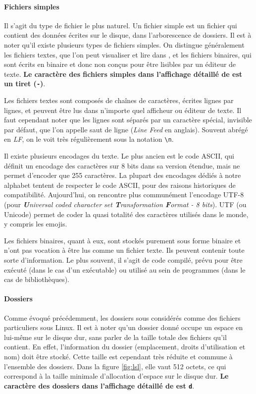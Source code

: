 \paragraph{Fichiers simples}
Il s'agit du type de fichier le plus naturel. Un fichier simple est un fichier qui contient des données écrites sur le disque, dans l'arborescence de dossiers.
Il est à noter qu'il existe plusieurs types de fichiers simples. On distingue généralement les fichiers textes, que l'on peut visualiser et lire dans , et les fichiers binaires, qui sont écrits en binaire et donc non conçus pour être lisibles par un éditeur de texte. \newline
\textbf{Le caractère des fichiers simples dans l'affichage détaillé de  est un tiret (\texttt{-})}.

Les fichiers textes sont composés de chaînes de caractères, écrites lignes par lignes, et peuvent être lus dans n'importe quel afficheur ou éditeur de texte. Il faut cependant noter que les lignes sont séparés par un caractère spécial, invisible par défaut, que l'on appelle saut de ligne (\textit{Line Feed} en anglais). Souvent abrégé en \textit{LF}, on le voit très régulièrement sous la notation \texttt{\textbackslash n}.

Il existe plusieurs encodages du texte. Le plus ancien est le code ASCII, qui définit un encodage des caractères sur 8 bits dans sa version étendue, mais ne permet d'encoder que 255 caractères. La plupart des encodages dédiés à notre alphabet tentent de respecter le code ASCII, pour des raisons historiques de compatibilité. Aujourd'hui, on rencontre plus communément l'encodage UTF-8 (pour \textit{\textbf{U}niversal coded character set \textbf{T}ransformation \textbf{F}ormat - 8 bits}). UTF (ou Unicode) permet de coder la quasi totalité des caractères utilisés dans le monde, y compris les emojis.

Les fichiers binaires, quant à eux, sont stockés purement sous forme binaire et n'ont pas vocation à être lus comme un fichier texte. Ils peuvent contenir toute sorte d'information. Le plus souvent, il s'agit de code compilé, prévu pour être exécuté (dans le cas d'un exécutable) ou utilisé au sein de programmes (dans le cas de bibliothèques).

\paragraph{Dossiers}
Comme évoqué précédemment, les dossiers sous considérés comme des fichiers particuliers sous Linux. Il est à noter qu'un dossier donné occupe un espace en lui-même sur le disque dur, sans parler de la taille totale des fichiers qu'il contient. En effet, l'information du dossier (emplacement, droits d'utilisation et nom) doit être stocké. Cette taille est cependant très réduite et commune à l'ensemble des dossiers. Dans la figure \ref{fig:lsl}, elle vaut 512 octets, ce qui correspond à la taille minimale d'allocation d'espace sur le disque dur.\newline 
\textbf{Le caractère des dossiers dans l'affichage détaillé de  est \texttt{d}}.

